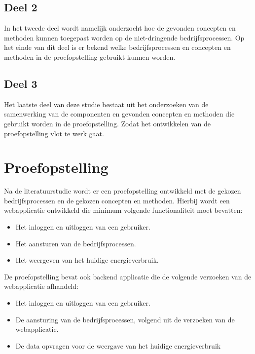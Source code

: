 \subsection{Deel 2}
\label{subsec:methodologie-literatuurstudie-deel2}

In het tweede deel wordt namelijk onderzocht hoe de gevonden concepten en methoden kunnen toegepast worden op de niet-dringende bedrijfsprocessen. Op het einde van dit deel is er bekend welke bedrijfsprocessen en concepten en methoden in de proefopstelling gebruikt kunnen worden.

\subsection{Deel 3}
\label{subsec:methodologie-literatuurstudie-deel3}

Het laatste deel van deze studie bestaat uit het onderzoeken van de samenwerking van de componenten en gevonden concepten en methoden die gebruikt worden in de proefopstelling. Zodat het ontwikkelen van de proefopstelling vlot te werk gaat.

\section{Proefopstelling}
\label{sec:methodologie-proefopstelling}

Na de literatuurstudie wordt er een proefopstelling ontwikkeld met de gekozen bedrijfsprocessen en de gekozen concepten en methoden. Hierbij wordt een webapplicatie ontwikkeld die minimum volgende functionaliteit moet bevatten:

\begin{itemize}
    \item Het inloggen en uitloggen van een gebruiker.
    \item Het aansturen van de bedrijfsprocessen.
    \item Het weergeven van het huidige energieverbruik.
\end{itemize}

De proefopstelling bevat ook backend applicatie die de volgende verzoeken van de webapplicatie afhandeld:

\begin{itemize}
    \item Het inloggen en uitloggen van een gebruiker.
    \item De aansturing van de bedrijfsprocessen, volgend uit de verzoeken van de webapplicatie.
    \item De data opvragen voor de weergave van het huidige energieverbruik
\end{itemize}

